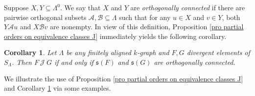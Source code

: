 \documentclass[a4paper,reqno,11pt]{amsart}
\numberwithin{equation}{section}
\newtheorem{cor}[thm]{Corollary}
\theoremstyle{definition}
\theoremstyle{remark}
\begin{document}
Suppose $X,Y\subseteq \Lambda^0$. We say that $X$ and $Y$ are \emph{orthogonally connected} if there are pairwise orthogonal subsets $\mathcal{A},\mathcal{B}\subseteq \Lambda$ such that for any $u\in X$ and $v\in Y$, both $Y\mathcal{A}u$ and $X\mathcal{B}v$ are nonempty. In view of this definition, Proposition \ref{pro partial orders on equivalence classes J} immediately yields the following corollary.
\begin{cor}\label{cor J relation on divergent sets}
Let $\Lambda$ be any finitely aligned $k$-graph and $F,G$ divergent elements of $S_\Lambda$. Then $F~\mathscr{J}~G$ if and only if $\mathfrak{s}(F)$ and $\mathfrak{s}(G)$ are orthogonally connected. 
\end{cor}

We illustrate the use of Proposition \ref{pro partial orders on equivalence classes J} and Corollary \ref{cor J relation on divergent sets} via some examples.
\end{document}
